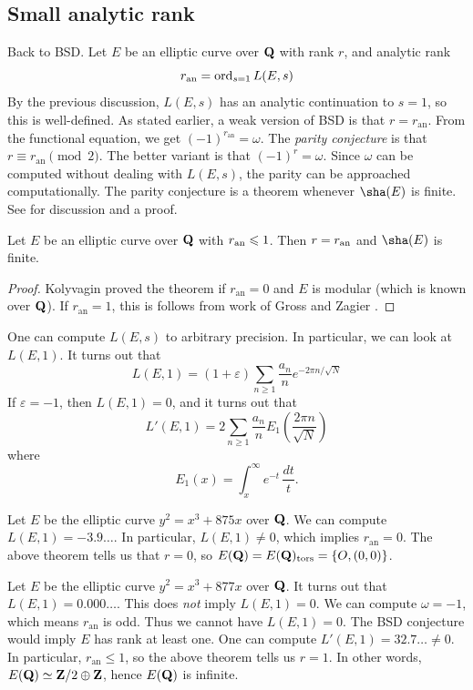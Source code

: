\subsection{Small analytic rank}

Back to BSD. Let $E$ be an elliptic curve over $\mathbf{Q}$ with rank $r$, and 
analytic rank 
\[
  r_\text{an} = \operatorname{ord}_{s=1} L(E,s)
\]
By the previous discussion, $L(E,s)$ has an analytic continuation to $s=1$, so 
this is well-defined. As stated earlier, a weak version of BSD is that 
$r=r_\text{an}$. 
From the functional equation, we get $(-1)^{r_\text{an}}=\omega$. The 
\emph{parity conjecture} is that $r\equiv r_\text{an}\pmod 2$. The better 
variant is that $(-1)^r=\omega$. Since $\omega$ can be computed without 
dealing with $L(E,s)$, the parity can be approached computationally. The parity 
conjecture is a theorem whenever $\sha(E)$ is finite. See 
\cite{do10} for discussion and a proof. 

\begin{theorem}\label{thm:r_an=0}
Let $E$ be an elliptic curve over $\mathbf{Q}$ with 
$r_\textnormal{an}\leqslant 1$. Then $r=r_\textnormal{an}$ and $\sha(E)$ is 
finite. 
\end{theorem}
\begin{proof}
Kolyvagin \cite{ko88} proved the theorem if $r_\text{an}=0$ and $E$ is modular 
(which is known over $\mathbf{Q}$). If $r_\text{an}=1$, this is follows from work of 
Gross and Zagier \cite{gz86}. 
\end{proof}

One can compute $L(E,s)$ to arbitrary precision. In particular, we can look at 
$L(E,1)$. It turns out that 
\[
  L(E,1) = (1+\varepsilon) \sum_{n\geqslant 1} \frac{a_n}{n} e^{-2\pi n/\sqrt N}
\]
If $\varepsilon=-1$, then $L(E,1)=0$, and it turns out that 
\[
  L'(E,1) = 2 \sum_{n\geqslant 1} \frac{a_n}{n} E_1\left(\frac{2\pi n}{\sqrt N}\right)
\]
where 
\[
  E_1(x) = \int_x^\infty e^{-t}\, \frac{dt}{t} \text{.}
\]

\begin{example}
Let $E$ be the elliptic curve $y^2=x^3+875 x$ over $\mathbf{Q}$. We can compute 
$L(E,1) = -3.9\ldots$. In particular, $L(E,1)\ne 0$, which implies 
$r_\text{an}=0$. The above theorem tells us that $r=0$, so 
$E(\mathbf{Q})=E(\mathbf{Q})_\text{tors}=\{O,(0,0)\}$. 
\end{example}

\begin{example}
Let $E$ be the elliptic curve $y^2=x^3+877 x$ over $\mathbf{Q}$. It turns out that 
$L(E,1) = 0.000\ldots$. This does \emph{not} imply $L(E,1) = 0$. We can 
compute $\omega=-1$, which means $r_\text{an}$ is odd. Thus we cannot have 
$L(E,1) = 0$. The BSD conjecture would imply $E$ has rank at least one. One 
can compute $L'(E,1) = 32.7\dots\ne 0$. In particular, 
$r_\text{an}\leqslant 1$, so the above theorem tells us $r=1$. In other words, 
$E(\mathbf{Q})\simeq \mathbf{Z}/2\oplus \mathbf{Z}$, hence $E(\mathbf{Q})$ is infinite. 
\end{example}










